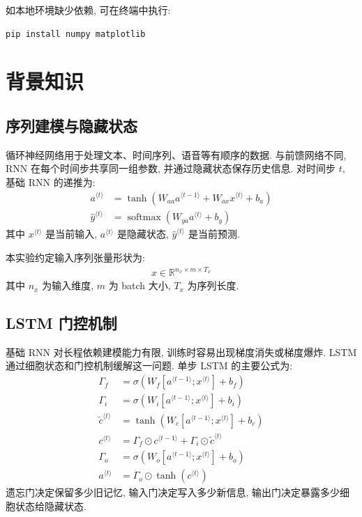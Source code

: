 \documentclass{../../nndlcourse}
\begin{document}
如本地环境缺少依赖, 可在终端中执行:
\begin{verbatim}
pip install numpy matplotlib
\end{verbatim}


\section{背景知识}

\subsection{序列建模与隐藏状态}

循环神经网络用于处理文本、时间序列、语音等有顺序的数据. 与前馈网络不同, RNN 在每个时间步共享同一组参数, 并通过隐藏状态保存历史信息. 对时间步 $t$, 基础 RNN 的递推为:
\begin{align}
    a^{\langle t\rangle}
    &= \tanh\left(W_{aa}a^{\langle t-1\rangle}
    + W_{ax}x^{\langle t\rangle} + b_a\right) \\
    \hat{y}^{\langle t\rangle}
    &= \operatorname{softmax}\left(W_{ya}a^{\langle t\rangle} + b_y\right)
\end{align}
其中 $x^{\langle t\rangle}$ 是当前输入, $a^{\langle t\rangle}$ 是隐藏状态, $\hat{y}^{\langle t\rangle}$ 是当前预测.

本实验约定输入序列张量形状为:
\begin{align}
    x \in \mathbb{R}^{n_x\times m\times T_x}
\end{align}
其中 $n_x$ 为输入维度, $m$ 为 batch 大小, $T_x$ 为序列长度.

\subsection{LSTM 门控机制}

基础 RNN 对长程依赖建模能力有限, 训练时容易出现梯度消失或梯度爆炸. LSTM 通过细胞状态和门控机制缓解这一问题. 单步 LSTM 的主要公式为:
\begin{align}
    \Gamma_f &= \sigma(W_f[a^{\langle t-1\rangle};x^{\langle t\rangle}] + b_f) \\
    \Gamma_i &= \sigma(W_i[a^{\langle t-1\rangle};x^{\langle t\rangle}] + b_i) \\
    \tilde{c}^{\langle t\rangle} &= \tanh(W_c[a^{\langle t-1\rangle};x^{\langle t\rangle}] + b_c) \\
    c^{\langle t\rangle} &= \Gamma_f\odot c^{\langle t-1\rangle}
    + \Gamma_i\odot \tilde{c}^{\langle t\rangle} \\
    \Gamma_o &= \sigma(W_o[a^{\langle t-1\rangle};x^{\langle t\rangle}] + b_o) \\
    a^{\langle t\rangle} &= \Gamma_o\odot \tanh(c^{\langle t\rangle})
\end{align}
遗忘门决定保留多少旧记忆, 输入门决定写入多少新信息, 输出门决定暴露多少细胞状态给隐藏状态.
\end{document}
